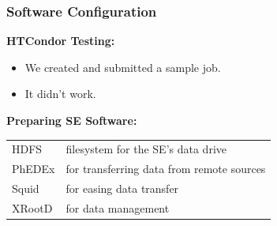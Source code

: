 \documentclass{beamer}
\begin{document}
\begin{frame}

  \frametitle{Software Configuration}

    \textbf{HTCondor Testing:}
    
    \begin{itemize}
    \item We created and submitted a sample job.
    \item It didn't work.
    \end{itemize}  


    \textbf{Preparing SE Software:}

    \begin{center}
      \begin{tabular}{|l|l|}
        \hline
        HDFS & filesystem for the SE's data drive \\
        PhEDEx & for transferring data from remote sources \\
        Squid & for easing data transfer \\
        XRootD & for data management \\
        \hline
      \end{tabular}
    \end{center}

\end{frame}

\end{document}
